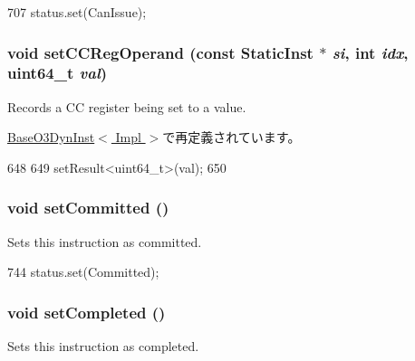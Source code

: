 \begin{DoxyCode}
707 { status.set(CanIssue); }
\end{DoxyCode}
\hypertarget{classBaseDynInst_afeb2b876cf6b29215cf9d6d56ba8863b}{
\subsubsection[{setCCRegOperand}]{\setlength{\rightskip}{0pt plus 5cm}void setCCRegOperand (const {\bf StaticInst} $\ast$ {\em si}, \/  int {\em idx}, \/  uint64\_\-t {\em val})}}
\label{classBaseDynInst_afeb2b876cf6b29215cf9d6d56ba8863b}
Records a CC register being set to a value. 

\hyperlink{classBaseO3DynInst_afeb2b876cf6b29215cf9d6d56ba8863b}{BaseO3DynInst$<$ Impl $>$}で再定義されています。


\begin{DoxyCode}
648     {
649         setResult<uint64_t>(val);
650     }
\end{DoxyCode}
\hypertarget{classBaseDynInst_a101a00eca65e94adc1377989d88a3c99}{
\subsubsection[{setCommitted}]{\setlength{\rightskip}{0pt plus 5cm}void setCommitted ()}}
\label{classBaseDynInst_a101a00eca65e94adc1377989d88a3c99}
Sets this instruction as committed. 


\begin{DoxyCode}
744 { status.set(Committed); }
\end{DoxyCode}
\hypertarget{classBaseDynInst_a3241c8bad3d5ddb517721b999a4e3670}{
\subsubsection[{setCompleted}]{\setlength{\rightskip}{0pt plus 5cm}void setCompleted ()}}
\label{classBaseDynInst_a3241c8bad3d5ddb517721b999a4e3670}
Sets this instruction as completed. 



